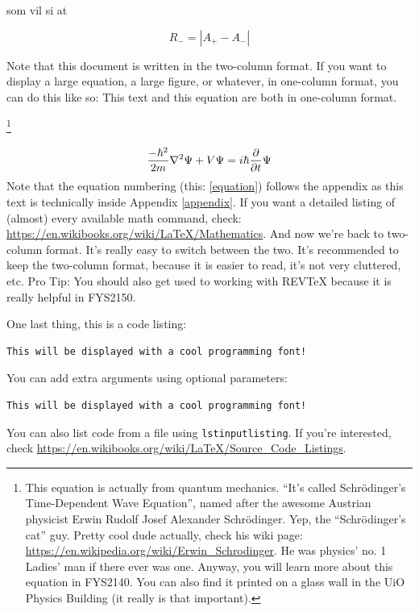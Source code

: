 \documentclass[reprint,english,notitlepage, nofootinbib]{revtex4-1}  %
\begin{document}
som vil si at

$$R_- = |A_+ - A_-|$$




\clearpage
Note that this document is written in the two-column format. If you want to display a large equation, a large figure, or whatever, in one-column format, you can do this like so:
\onecolumngrid
\vspace{1cm} %
This text and this equation are both in one-column format.

\footnote{This equation is actually from quantum mechanics. ``It's called Schrödinger's Time-Dependent Wave Equation'', named after the awesome Austrian physicist Erwin Rudolf Josef Alexander Schrödinger. Yep, the ``Schrödinger's cat'' guy. Pretty cool dude actually, check his wiki page: \url{https://en.wikipedia.org/wiki/Erwin_Schrodinger}. He was physics' no. 1 Ladies' man if there ever was one. Anyway, you will learn more about this equation in FYS2140. You can also find it printed on a glass wall in the UiO Physics Building (it really is that important).}

\begin{equation}\label{equation}
\frac{-\hbar^2}{2m}\laplacian{\Psi}+V\Psi=i\hbar\pdv{t}\Psi
\end{equation}
Note that the equation numbering (this: \ref{equation}) follows the appendix as this text is technically inside Appendix \ref{appendix}. If you want a detailed listing of (almost) every available math command, check: \url{https://en.wikibooks.org/wiki/LaTeX/Mathematics}.
\vspace{1cm} %
\twocolumngrid
And now we're back to two-column format. It's really easy to switch between the two. It's recommended to keep the two-column format, because it is easier to read, it's not very cluttered, etc. Pro Tip: You should also get used to working with REVTeX because it is really helpful in FYS2150.

One last thing, this is a code listing:
\begin{lstlisting}
This will be displayed with a cool programming font!
\end{lstlisting}
You can add extra arguments using optional parameters:
\begin{lstlisting}[morekeywords={cool}]
This will be displayed with a cool programming font!
\end{lstlisting}
You can also list code from a file using \texttt{lstinputlisting}. If you're interested, check \url{https://en.wikibooks.org/wiki/LaTeX/Source_Code_Listings}.
\end{document}
